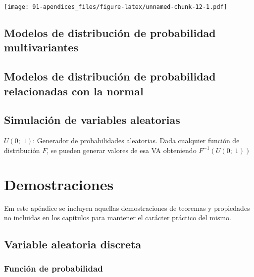 \documentclass[
]{book}
\begin{document}
\texttt{[image: 91-apendices\_files/figure-latex/unnamed-chunk-12-1.pdf]}

\hypertarget{modelos-de-distribuciuxf3n-de-probabilidad-multivariantes}{%
\section{Modelos de distribución de probabilidad multivariantes}\label{modelos-de-distribuciuxf3n-de-probabilidad-multivariantes}}

\hypertarget{modelos-de-distribuciuxf3n-de-probabilidad-relacionadas-con-la-normal}{%
\section{Modelos de distribución de probabilidad relacionadas con la normal}\label{modelos-de-distribuciuxf3n-de-probabilidad-relacionadas-con-la-normal}}

\hypertarget{simulaciuxf3n-de-variables-aleatorias}{%
\section{Simulación de variables aleatorias}\label{simulaciuxf3n-de-variables-aleatorias}}

\(U(0;\; 1)\): Generador de probabilidades aleatorias. Dada cualquier función de distribución \(F\), se pueden generar valores de esa VA obteniendo \(F^{-1}(U(0;\; 1))\)

\hypertarget{demostraciones}{%
\chapter{Demostraciones}\label{demostraciones}}

Em este apéndice se incluyen aquellas demostraciones de teoremas y propiedades
no incluidas en los capítulos para mantener el carácter práctico del mismo.

\hypertarget{variable-aleatoria-discreta}{%
\section{Variable aleatoria discreta}\label{variable-aleatoria-discreta}}

\hypertarget{funciuxf3n-de-probabilidad}{%
\subsection{Función de probabilidad}\label{funciuxf3n-de-probabilidad}}
\end{document}
